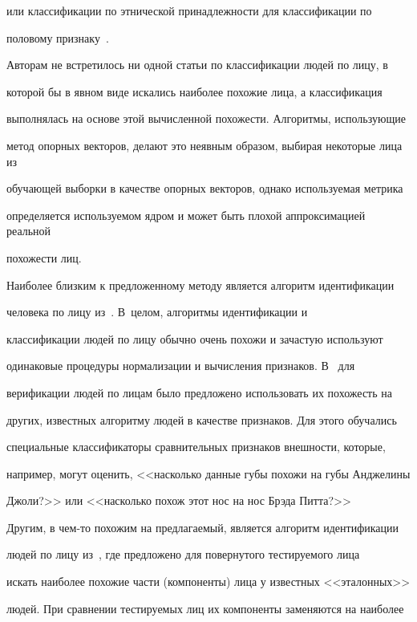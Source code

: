 или классификации по этнической принадлежности для классификации по 


половому признаку~\cite{4-k}.





Авторам не встретилось ни одной статьи по классификации людей по лицу, в 


которой бы в явном виде искались наиболее похожие лица, а классификация 


выполнялась на основе этой вычисленной похожести. Алгоритмы, использующие 


метод опорных векторов, делают это неявным образом, выбирая некоторые лица из 


обучающей выборки в качестве опорных векторов, однако используемая метрика 


определяется используемом ядром и может быть плохой аппроксимацией реальной 


похожести лиц. 





Наиболее близким к предложенному методу является алгоритм идентификации 


человека по лицу из~\cite{10-k}. В~целом, алгоритмы идентификации и 


классификации людей по лицу обычно очень похожи и зачастую используют 


одинаковые процедуры нормализации и вычисления признаков. В~\cite{10-k} для 


верификации людей по лицам было предложено использовать их похожесть на 


других, известных алгоритму людей в качестве признаков. Для этого обучались 


специальные классификаторы сравнительных признаков внешности, которые, 


например, могут оценить, <<насколько данные губы похожи на губы Анджелины 


Джоли?>> или <<насколько похож этот нос на нос Брэда Питта?>>





Другим, в чем-то похожим на предлагаемый, является алгоритм идентификации 


людей по лицу из~\cite{21-k}, где предложено для повернутого тестируемого лица 


искать наиболее похожие части (компоненты) лица у известных <<эталонных>> 


людей. При сравнении тестируемых лиц их компоненты заменяются на наиболее 


